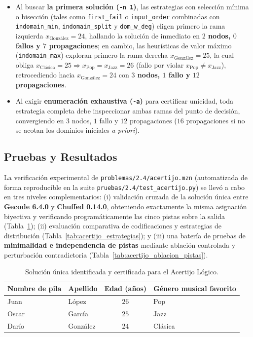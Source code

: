 \begin{enumerate}
    \begin{itemize}
        \item Al buscar \textbf{la primera solución (\texttt{-n 1})}, las estrategias con selección mínima o bisección (tales como \texttt{first\_fail} o \texttt{input\_order} combinadas con \texttt{indomain\_min}, \texttt{indomain\_split} y \texttt{dom\_w\_deg}) eligen primero la rama izquierda $x_{\text{González}} = 24$, hallando la solución de inmediato en \textbf{$2$ nodos, $0$ fallos y $7$ propagaciones}; en cambio, las heurísticas de valor máximo (\texttt{indomain\_max}) exploran primero la rama derecha $x_{\text{González}} = 25$, la cual obliga $x_{\text{Clásica}} = 25 \Rightarrow x_{\text{Pop}} = x_{\text{Jazz}} = 26$ (fallo por violar $x_{\text{Pop}} \neq x_{\text{Jazz}}$), retrocediendo hacia $x_{\text{González}} = 24$ con \textbf{$3$ nodos, $1$ fallo y $12$ propagaciones}.
        \item Al exigir \textbf{enumeración exhaustiva (\texttt{-a})} para certificar unicidad, toda estrategia completa debe inspeccionar ambas ramas del punto de decisión, convergiendo en $3$ nodos, $1$ fallo y $12$ propagaciones ($16$ propagaciones si no se acotan los dominios iniciales \emph{a priori}).
    \end{itemize}
\end{enumerate}

\subsection{Pruebas y Resultados}

La verificación experimental de \texttt{problemas/2.4/acertijo.mzn} (automatizada de forma reproducible en la suite \texttt{pruebas/2.4/test\_acertijo.py}) se llevó a cabo en tres niveles complementarios: (i) validación cruzada de la solución única entre \textbf{Gecode 6.4.0} y \textbf{Chuffed 0.14.0}, obteniendo exactamente la misma asignación biyectiva y verificando programáticamente las cinco pistas sobre la salida (Tabla~\ref{tab:acertijo_solucion}); (ii) evaluación comparativa de codificaciones y estrategias de distribución (Tabla~\ref{tab:acertijo_estrategias}); y (iii) una batería de pruebas de \textbf{minimalidad e independencia de pistas} mediante ablación controlada y perturbación contradictoria (Tabla~\ref{tab:acertijo_ablacion_pistas}).

\begin{table}[htbp]
    \centering
    \begin{tabular}{llcl}
        \toprule
        Nombre de pila & Apellido & Edad (años) & Género musical favorito \\
        \midrule
        Juan  & López    & $26$ & Pop \\
        Oscar & García   & $25$ & Jazz \\
        Darío & González & $24$ & Clásica \\
        \bottomrule
    \end{tabular}
    \caption{Solución única identificada y certificada para el Acertijo Lógico.}
    \label{tab:acertijo_solucion}
\end{table}

